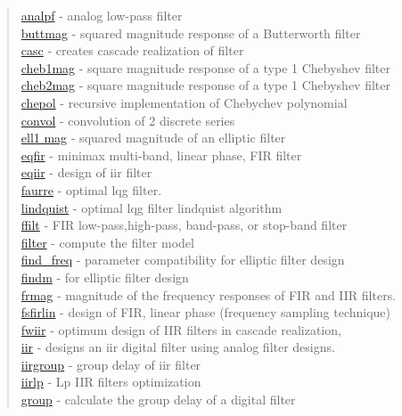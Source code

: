 \begin{quote}
\noindent
\hyperlink{analpf}{analpf} - analog low-pass filter \\
\hyperlink{buttmag}{buttmag} - squared magnitude response of a Butterworth filter \\
\hyperlink{casc}{casc} - creates cascade realization of filter \\
\hyperlink{cheb1mag}{cheb1mag} - square magnitude response of a type 1 Chebyshev filter \\
\hyperlink{cheb2mag}{cheb2mag} - square magnitude response of a type 1 Chebyshev filter \\
\hyperlink{chepol}{chepol} - recursive implementation of Chebychev polynomial \\
\hyperlink{convol}{convol} - convolution of 2 discrete series \\
\hyperlink{ell1 mag}{ell1 mag} - squared magnitude of an elliptic filter \\
\hyperlink{eqfir}{eqfir} - minimax multi-band, linear phase, FIR filter \\
\hyperlink{eqiir}{eqiir} - design of iir filter \\
\hyperlink{faurre}{faurre} - optimal lqg filter. \\
\hyperlink{lindquist}{lindquist} - optimal lqg filter lindquist algorithm \\
\hyperlink{ffilt}{ffilt} - FIR low-pass,high-pass, band-pass, or stop-band filter \\
\hyperlink{filter}{filter} - compute the filter model \\
\hyperlink{find_freq}{find\_freq} - parameter compatibility for elliptic filter design \\
\hyperlink{findm}{findm} - for elliptic filter design \\
\hyperlink{frmag}{frmag} - magnitude of the frequency responses of FIR and IIR filters. \\
\hyperlink{fsfirlin}{fsfirlin} - design of FIR, linear phase (frequency sampling technique) \\
\hyperlink{fwiir}{fwiir} - optimum design of IIR filters in cascade realization, \\
\hyperlink{iir}{iir} - designs an iir digital filter using analog filter designs. \\
\hyperlink{iirgroup}{iirgroup} - group delay of iir filter \\
\hyperlink{iirlp}{iirlp} - Lp IIR filters optimization \\
\hyperlink{group}{group} - calculate the group delay of a digital filter \\

\end{quote}

